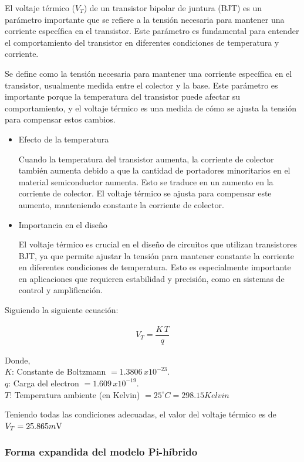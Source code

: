 El voltaje térmico ($V_T$) de un transistor bipolar de juntura (BJT) es un parámetro importante que se refiere a la tensión necesaria para mantener una corriente específica en el transistor. Este parámetro es fundamental para entender el comportamiento del transistor en diferentes condiciones de temperatura y corriente.

Se define como la tensión necesaria para mantener una corriente específica en el transistor, usualmente medida entre el colector y la base. Este parámetro es importante porque la temperatura del transistor puede afectar su comportamiento, y el voltaje térmico es una medida de cómo se ajusta la tensión para compensar estos cambios.

\begin{itemize}
    \item Efecto de la temperatura

          Cuando la temperatura del transistor aumenta, la corriente de colector también aumenta debido a que la cantidad de portadores minoritarios en el material semiconductor aumenta. Esto se traduce en un aumento en la corriente de colector. El voltaje térmico se ajusta para compensar este aumento, manteniendo constante la corriente de colector.
    \item Importancia en el diseño

          El voltaje térmico es crucial en el diseño de circuitos que utilizan transistores BJT, ya que permite ajustar la tensión para mantener constante la corriente en diferentes condiciones de temperatura. Esto es especialmente importante en aplicaciones que requieren estabilidad y precisión, como en sistemas de control y amplificación.
\end{itemize}

Siguiendo la siguiente ecuación:

\begin{gather}
    V_T=\dfrac{K \, T}{q}
\end{gather}

Donde, \\
$K$: Constante de Boltzmann $= 1.3806 \, x 10^{-23}$. \\
$q$: Carga del electron $= 1.609 \,x 10^{-19}$. \\
$T$: Temperatura ambiente (en Kelvin) $=25^{\circ} C=298.15 Kelvin$

Teniendo todas las condiciones adecuadas, el valor del voltaje térmico es de $V_T=25.865 m\volt$

\subsubsection{Forma expandida del modelo Pi-híbrido}


